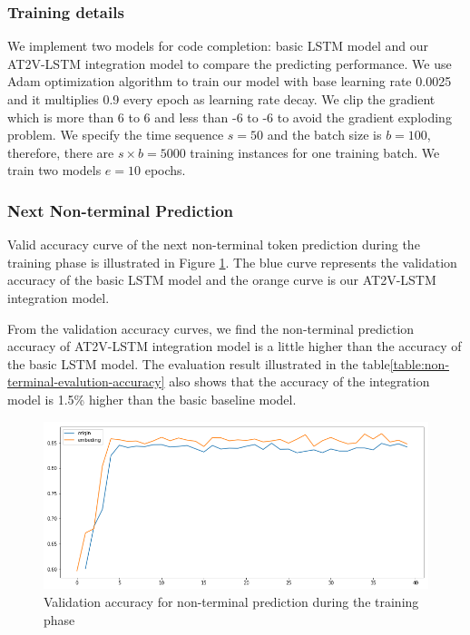 \documentclass[E]{compsoft}
\begin{document}
\subsubsection{Training details}
We implement two models for code completion: basic LSTM model and our AT2V-LSTM integration model to compare the predicting performance. 
We use Adam optimization algorithm to train our model with base learning rate 0.0025 and it multiplies 0.9 every epoch as learning rate decay. 
We clip the gradient which is more than 6 to 6 and less than -6 to -6 to avoid the gradient exploding problem.
We specify the time sequence $s=50$ and the batch size is $b=100$, therefore, there are $s \times b = 5000$ training instances for one training batch. 
We train two models $e=10$ epochs.

\subsubsection{Next Non-terminal Prediction} 
Valid accuracy curve of the next non-terminal token prediction during the training phase is illustrated in Figure \ref{fig:valid_accuracy_for_non_terminal}. 
The blue curve represents the validation accuracy of the basic LSTM model and the orange curve is our AT2V-LSTM integration model. 

From the validation accuracy curves, we find the non-terminal prediction accuracy of AT2V-LSTM integration model is a little higher than the accuracy of the basic LSTM model. The evaluation result illustrated in the table\ref{table:non-terminal-evalution-accuracy} also shows that the accuracy of the integration model is 1.5\% higher than the basic baseline model. 

\begin{figure}[!ht]
\centering
\includegraphics[scale=0.25]{pictures/nt_valid_accuracy.png}
\caption{Validation accuracy for non-terminal prediction during the training phase}
\label{fig:valid_accuracy_for_non_terminal}
\end{figure}
\end{document}
